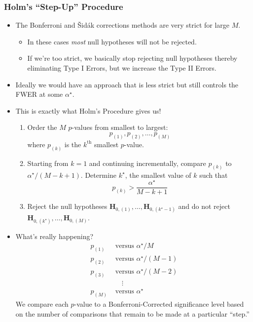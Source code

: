 \subsubsection*{Holm's ``Step-Up'' Procedure}
\begin{itemize}
    \item The Bonferroni and Šidák corrections methods are very strict for large $M$.
          \begin{itemize}
              \item In these cases \emph{most} null hypotheses will not be rejected.
              \item If we're too strict, we basically stop rejecting null hypotheses thereby
                    eliminating Type I Errors, but we increase the Type II Errors.
          \end{itemize}
    \item Ideally we would have an approach that is less strict but still controls the FWER at some $ \alpha^\star $.
    \item This is exactly what Holm's Procedure gives us!
          \begin{framed}
              \begin{enumerate}
                  \item Order the $M$ $p$-values from smallest to largest:
                        \[ p_{(1)},p_{(2)},\ldots,p_{(M)} \]
                        where $ p_{(k)} $ is the $ k^{\text{th}} $ smallest $ p $-value.
                  \item Starting from $ k=1 $ and continuing incrementally, compare
                        $ p_{(k)} $ to $ \alpha^\star/(M-k+1) $. Determine $ k^\star $,
                        the smallest value of $ k $ such that
                        \[ p_{(k)}>\frac{\alpha^\star}{M-k+1} \]
                  \item Reject the null hypotheses $ \mathbf{H}_{0,(1)},\ldots,\mathbf{H}_{0,(k^\star-1)} $
                        and do not reject $ \mathbf{H}_{0,(k^\star)},\ldots,\mathbf{H}_{0,(M)} $.
              \end{enumerate}
          \end{framed}
    \item What's really happening?
          \begin{align*}
              p_{(1)} & \text{ versus } \alpha^\star/M     \\
              p_{(2)} & \text{ versus } \alpha^\star/(M-1) \\
              p_{(3)} & \text{ versus } \alpha^\star/(M-2) \\
                      & \quad\;\vdots                      \\
              p_{(M)} & \text{ versus } \alpha^\star
          \end{align*}
          We compare each $ p $-value to a Bonferroni-Corrected significance
          level based on the number of comparisons that remain to be
          made at a particular ``step.''
\end{itemize}
